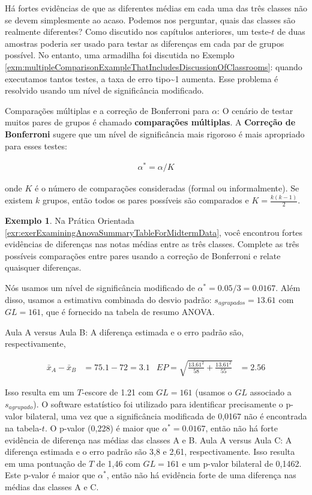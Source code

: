 \documentclass[
]{book}
\theoremstyle{definition}
\theoremstyle{definition}
\newtheorem{example}{Exemplo}[chapter]
\theoremstyle{definition}
\theoremstyle{definition}
\theoremstyle{remark}
\begin{document}
Há fortes evidências de que as diferentes médias em cada uma das três classes não se devem simplesmente ao acaso. Podemos nos perguntar, quais das classes são realmente diferentes? Como discutido nos capítulos anteriores, um teste-\(t\) de duas amostras poderia ser usado para testar as diferenças em cada par de grupos possível. No entanto, uma armadilha foi discutida no Exemplo \ref{exm:multipleComparisonExampleThatIncludesDiscussionOfClassrooms}: quando executamos tantos testes, a taxa de erro tipo\textasciitilde1 aumenta. Esse problema é resolvido usando um nível de significância modificado.

Comparações múltiplas e a correção de Bonferroni para \(\alpha\): O cenário de testar muitos pares de grupos é chamado \textbf{comparações múltiplas}. A \textbf{Correção de Bonferroni} sugere que um nível de significância mais rigoroso é mais apropriado para esses testes:

\begin{align*}
\alpha^* = \alpha / K
\end{align*}

onde \(K\) é o número de comparações consideradas (formal ou informalmente). Se existem \(k\) grupos, então todos os pares possíveis são comparados e \(K=\frac{k(k-1)}{2}\).

\begin{example}
\protect\hypertarget{exm:multipleComparisonsOfThreeStatClasses}{}{\label{exm:multipleComparisonsOfThreeStatClasses} }Na Prática Orientada \ref{exr:exerExaminingAnovaSummaryTableForMidtermData}, você encontrou fortes evidências de diferenças nas notas médias entre as três classes. Complete as três possíveis comparações entre pares usando a correção de Bonferroni e relate quaisquer diferenças.
\end{example}

Nós usamos um nível de significância modificado de \(\alpha^* = 0.05/3 = 0.0167\). Além disso, usamos a estimativa combinada do desvio padrão: \(s_{agrupados}=13.61\) com \(GL=161\), que é fornecido na tabela de resumo ANOVA.

Aula A versus Aula B: A diferença estimada e o erro padrão são, respectivamente,

\begin{align*}
\bar{x}_A - \bar{x}_{B} &= 75.1 - 72 = 3.1
    &EP = \sqrt{\frac{13.61^2}{58} + \frac{13.61^2}{55}} &= 2.56
\end{align*}

Isso resulta em um \(T\)-escore de 1.21 com \(GL = 161\) (usamos o \(GL\) associado a \(s_{agrupado}\)). O software estatístico foi utilizado para identificar precisamente o p-valor bilateral, uma vez que a significância modificada de 0,0167 não é encontrada na tabela-\(t\). O p-valor (0,228) é maior que \(\alpha^*=0.0167\), então não há forte evidência de diferença nas médias das classes A e B.
Aula A versus Aula C: A diferença estimada e o erro padrão são 3,8 e 2,61, respectivamente. Isso resulta em uma pontuação de \(T\) de 1,46 com \(GL=161\) e um p-valor bilateral de 0,1462. Este p-valor é maior que \(\alpha^*\), então não há evidência forte de uma diferença nas médias das classes A e C.
\end{document}
